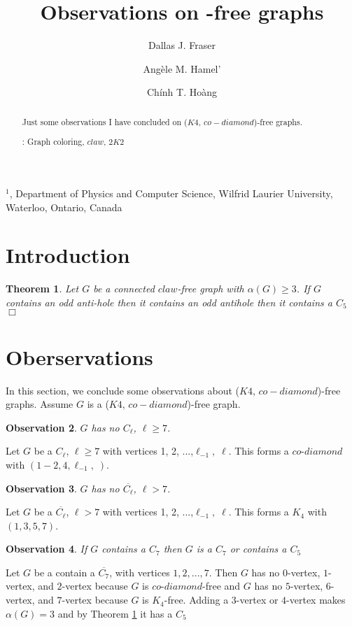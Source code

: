 \documentclass[12pt]{article}
\title{Observations on {\KCD}-free graphs}
\author{
	Dallas J. Fraser\inst{1}
	\and Ang\`ele M. Hamel'\inst{1}
	\and Ch\'inh T. Ho\`ang\inst{1}
}
\newtheorem{Theorem}{Theorem}[section]
\newtheorem{Observation}[Theorem]{Observation}
\def\inst#1{$^{#1}$}
\def\KCD{($K4$, $co-diamond$)}
\begin{document}
\maketitle

\begin{center}
{\footnotesize

\inst{1}, Department of Physics and Computer Science, Wilfrid Laurier
University, \\Waterloo, Ontario, Canada}

\end{center}

\begin{abstract}
Just some observations I have concluded on {\KCD}-free graphs.

: Graph coloring, $claw$, $2K2$
\end{abstract}


\section{Introduction}\label{sec:intro}

\begin{Theorem}\label{thm:ben-rebea}
Let $G$ be a connected $claw$-free graph with $\alpha(G) \geq 3$. If $G$ contains an odd anti-hole then it contains an odd antihole then it contains a $C_5$ $\Box$
\end{Theorem}

\section{Oberservations}\label{sec:observations}
In this section, we conclude some observations about {\KCD}-free graphs. Assume $G$ is a {\KCD}-free graph.
\begin{Observation}\label{obs:no-cl}
$G$ has no $C_\ell$, $\ell \geq 7$.
\end{Observation}
 Let $G$ be a $C_\ell$, $\ell \geq 7$ with vertices 1, 2, ...,$\ell_{-1},\; \ell$. This forms a $co$-$diamond$ with $(1-2, 4, \ell_{-1},\; )$.

\begin{Observation}\label{obs:no-anti-cl}
$G$ has no $\overline{C_\ell}$, $\ell > 7$.
\end{Observation}
 Let $G$ be a $\overline{C_\ell}$, $\ell > 7$ with vertices 1, 2, ...,$\ell_{-1},\; \ell$. This forms a $K_4$ with $(1, 3, 5, 7)$.

\begin{Observation}\label{obs:c7-has-c5}
If $G$ contains a $C_7$ then $G$ is a $C_7$ or contains a $C_5$ 
\end{Observation}
 Let $G$ be a contain a $\overline{C_7}$, with vertices $1, 2, ...,7$. Then $G$ has no $0$-vertex, $1$-vertex, and $2$-vertex because $G$ is $co$-$diamond$-free and $G$ has no $5$-vertex, $6$-vertex, and $7$-vertex because $G$ is $K_4$-free. Adding a $3$-vertex or $4$-vertex makes $\alpha(G) = 3$ and by Theorem \ref{thm:ben-rebea} it has a $C_5$
\end{document}
